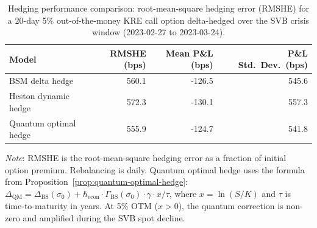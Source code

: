 \begin{table}[htbp]
\centering
\caption{Hedging performance comparison: root-mean-square hedging error (RMSHE) for a 20-day 5\% out-of-the-money KRE call option delta-hedged over the SVB crisis window (2023-02-27 to 2023-03-24).}
\label{tab:hedging-rmshe}
\begin{tabular}{lrrr}
\hline
Model & RMSHE (bps) & Mean P\&L (bps) & P\&L Std.\ Dev.\ (bps) \\
\hline
BSM delta hedge           & 560.1 & -126.5 & 545.6 \\
Heston dynamic hedge      & 572.3 & -130.1 & 557.3 \\
Quantum optimal hedge     & 555.9 & -124.7 & 541.8 \\
\hline
\end{tabular}

\medskip
\footnotesize
\textit{Note}: RMSHE is the root-mean-square hedging error as a fraction of initial option premium. Rebalancing is daily. Quantum optimal hedge uses the formula from Proposition~\ref{prop:quantum-optimal-hedge}: $\Delta_{\mathrm{QM}} = \Delta_{\mathrm{BS}}(\sigma_0) + \hbar_{\mathrm{econ}} \cdot \Gamma_{\mathrm{BS}}(\sigma_0) \cdot \gamma \cdot x/\tau$, where $x = \ln(S/K)$ and $\tau$ is time-to-maturity in years. At 5\% OTM ($x>0$), the quantum correction is non-zero and amplified during the SVB spot decline.
\end{table}
